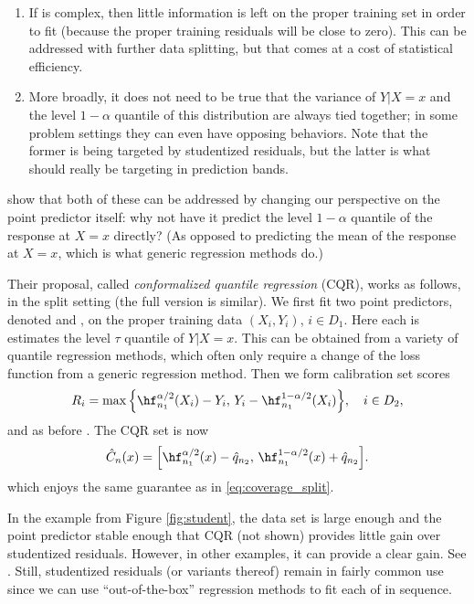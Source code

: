 \documentclass{article}
\begin{document}
\begin{enumerate}
\item If  is complex, then little information is left on the
  proper training set in order to fit  (because the
  proper training residuals will be close to zero). This can be addressed with
  further data splitting, but that comes at a cost of statistical efficiency. 

\item More broadly, it does not need to be true that the variance of $Y|X=x$ and
  the level $1-\alpha$ quantile of this distribution are always tied together;
  in some problem settings they can even have opposing behaviors. Note that the
  former is being targeted by studentized residuals, but the latter is what
  should really be targeting in prediction bands.       
\end{enumerate}

\citet{romano2019conformalized} show that both of these can be addressed by
changing our perspective on the point predictor itself: why not have it predict
the level $1-\alpha$ quantile of the response at $X=x$ directly? (As opposed to
predicting the mean of the response at $X=x$, which is what generic regression
methods do.) 

Their proposal, called \emph{conformalized quantile regression} (CQR), works as
follows, in the split setting (the full version is similar). We first fit two
point predictors, denoted  and
, on the proper training data $(X_i,Y_i)$, $i  
\in D_1$. Here each  is estimates the level $\tau$
quantile of $Y|X=x$. This can be obtained from a variety of quantile regression  
methods, which often only require a change of the loss function from a generic
regression method. Then we form calibration set scores    
\[
R_i = \max\Big\{\hf^{\alpha/2}_{n_1}(X_i) - Y_i, \, 
Y_i - \hf^{1-\alpha/2}_{n_1}(X_i) \Big\}, \quad i \in D_2, 
\]
and as before . The CQR set is now  
\begin{equation}
\label{eq:cset_cqr_split}
\hC_n(x) = \Big[ \hf^{\alpha/2}_{n_1}(x) - \hq_{n_2}, \,
\hf^{1-\alpha/2}_{n_1}(x) + \hq_{n_2} \Big].
\end{equation}
which enjoys the same guarantee as in \eqref{eq:coverage_split}. 

In the example from Figure \ref{fig:student}, the data set is large enough and
the point predictor stable enough that CQR (not shown) provides little gain over
studentized residuals. However, in other examples, it can provide a clear  
gain. See \citet{romano2019conformalized}. Still, studentized residuals (or
variants thereof) remain in fairly common use since we can use
``out-of-the-box'' regression methods to fit each of  in sequence.
\end{document}
